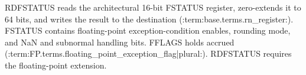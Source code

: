 RDFSTATUS reads the architectural 16-bit FSTATUS register, zero-extends it to 64 bits, and writes the result to the destination (:term:base.terms.rn_register:). FSTATUS contains floating-point exception-condition enables, rounding mode, and NaN and subnormal handling bits. FFLAGS holds accrued (:term:FP.terms.floating_point_exception_flag|plural:). RDFSTATUS requires the floating-point extension.
